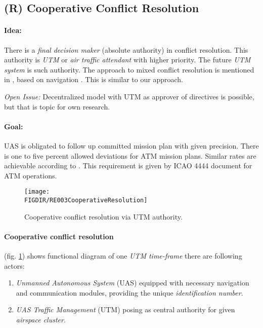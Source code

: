 \subsection{(R) Cooperative Conflict Resolution}\label{sec:cooperativeConflictResolution}


\paragraph{Idea:} There is a \emph{final decision maker} (absolute authority) in conflict resolution. This authority is \emph{UTM} or \emph{air traffic attendant} with higher priority. The future \emph{UTM system} is such authority. The approach to mixed conflict resolution is mentioned in \cite{ramasamy2014towards}, based on navigation \cite{ramasamy2013novel}. This is similar to our approach. 

\begin{note}
    \emph{Open Issue:} Decentralized model with UTM as approver of directives is possible, but that is topic for own research.
\end{note}

\paragraph{Goal:} UAS is obligated to follow up committed mission plan with given precision.  There is one to five percent  allowed deviations for ATM mission plans.     Similar rates are achievable according to \cite{ramasamy2014towards}.  This requirement is given by \cite{icao4444} ICAO 4444 document for ATM operations.

\begin{figure}[H]
    \centering
    \texttt{[image: \\FIGDIR/RE003CooperativeResolution]} 
    \caption{Cooperative conflict resolution via UTM authority.}
    \label{fig:CooperativeConflictResolutionUTM}
\end{figure}

\paragraph{Cooperative conflict resolution} (fig. \ref{fig:CooperativeConflictResolutionUTM}) shows functional diagram of one \emph{UTM time-frame} there  are following actors:
\begin{enumerate}
    \item \emph{Unmanned Autonomous System} (UAS) equipped with necessary navigation and communication modules, providing the unique \emph{identification number}.
    
    \item \emph{UAS Traffic Management} (UTM) posing as central authority for given \emph{airspace cluster}.
\end{enumerate}

